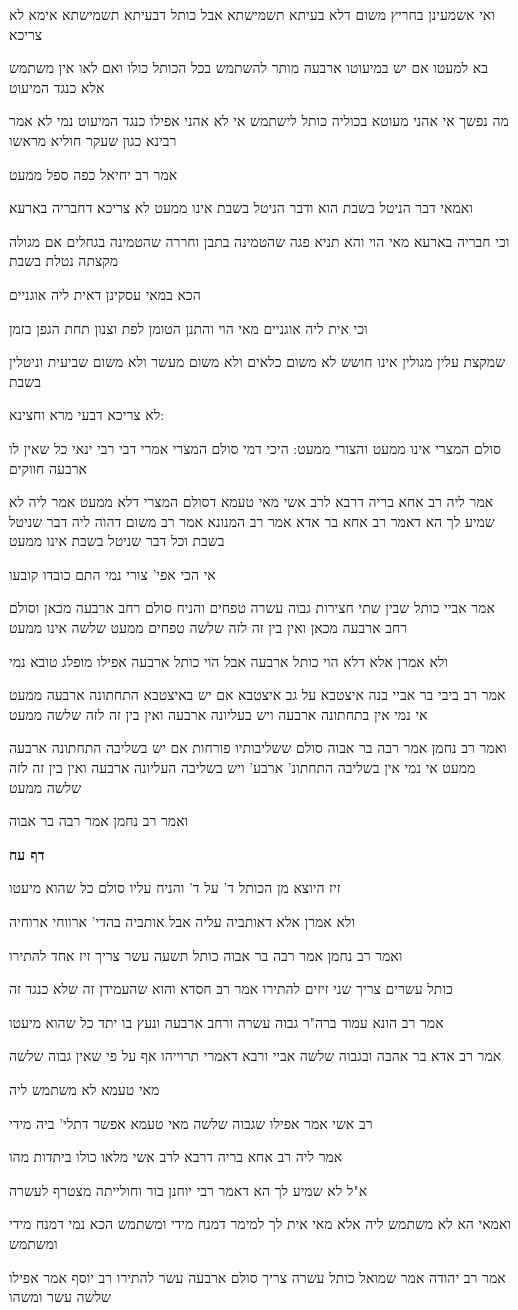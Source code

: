 \documentclass[12pt, openany]{book}
\newcommand{\sethebfont}{
\fontsize{10.5pt}{21.0pt} \selectfont
}
\newcommand{\textblock}[1]{
{\sethebfont #1\\}	
}
\newcommand{\sectname}{}
\newcommand{\newsection}[1]{
	\addcontentsline{toc}{section}{#1}
	\renewcommand{\sectname}{#1}	
	\vspace{-\baselineskip}
	\begin{center}
		\textbf{%
\fontsize{16pt}{16pt}\selectfont
			#1}
	\end{center}
	\vspace{-\baselineskip}
	\nopagebreak
}
\begin{document}
\textblock{ואי אשמעינן בחריץ משום דלא בעיתא תשמישתא אבל כותל דבעיתא תשמישתא אימא לא צריכא}
\textblock{בא למעטו אם יש במיעוטו ארבעה מותר להשתמש בכל הכותל כולו ואם לאו אין משתמש אלא כנגד המיעוט}
\textblock{מה נפשך אי אהני מעוטא בכוליה כותל לישתמש אי לא אהני אפילו כנגד המיעוט נמי לא אמר רבינא כגון שעקר חוליא מראשו}
\textblock{אמר רב יחיאל כפה ספל ממעט}
\textblock{ואמאי דבר הניטל בשבת הוא ודבר הניטל בשבת אינו ממעט לא צריכא דחבריה בארעא}
\textblock{וכי חבריה בארעא מאי הוי והא תניא פגה שהטמינה בתבן וחררה שהטמינה בגחלים אם מגולה מקצתה נטלת בשבת}
\textblock{הכא במאי עסקינן דאית ליה אוגניים}
\textblock{וכי אית ליה אוגניים מאי הוי והתנן הטומן לפת וצנון תחת הגפן בזמן}
\textblock{שמקצת עלין מגולין אינו חושש לא משום כלאים ולא משום מעשר ולא משום שביעית וניטלין בשבת}
\textblock{לא צריכא דבעי מרא וחצינא:}
\textblock{סולם המצרי אינו ממעט והצורי ממעט: היכי דמי סולם המצרי אמרי דבי רבי ינאי כל שאין לו ארבעה חווקים}
\textblock{אמר ליה רב אחא בריה דרבא לרב אשי מאי טעמא דסולם המצרי דלא ממעט אמר ליה לא שמיע לך הא דאמר רב אחא בר אדא אמר רב המנונא אמר רב משום דהוה ליה דבר שניטל בשבת וכל דבר שניטל בשבת אינו ממעט}
\textblock{אי הכי אפי' צורי נמי התם כובדו קובעו}
\textblock{אמר אביי כותל שבין שתי חצירות גבוה עשרה טפחים והניח סולם רחב ארבעה מכאן וסולם רחב ארבעה מכאן ואין בין זה לזה שלשה טפחים ממעט שלשה אינו ממעט}
\textblock{ולא אמרן אלא דלא הוי כותל ארבעה אבל הוי כותל ארבעה אפילו מופלג טובא נמי}
\textblock{אמר רב ביבי בר אביי בנה איצטבא על גב איצטבא אם יש באיצטבא התחתונה ארבעה ממעט אי נמי אין בתחתונה ארבעה ויש בעליונה ארבעה ואין בין זה לזה שלשה ממעט}
\textblock{ואמר רב נחמן אמר רבה בר אבוה סולם ששליבותיו פורחות אם יש בשליבה התחתונה ארבעה ממעט אי נמי אין בשליבה התחתונ' ארבע' ויש בשליבה העליונה ארבעה ואין בין זה לזה שלשה ממעט}
\textblock{ואמר רב נחמן אמר רבה בר אבוה}
\newsection{דף עח}
\textblock{זיז היוצא מן הכותל ד' על ד' והניח עליו סולם כל שהוא מיעטו}
\textblock{ולא אמרן אלא דאותביה עליה אבל אותביה בהדי' ארווחי ארוחיה}
\textblock{ואמר רב נחמן אמר רבה בר אבוה כותל תשעה עשר צריך זיז אחד להתירו}
\textblock{כותל עשרים צריך שני זיזים להתירו אמר רב חסדא והוא שהעמידן זה שלא כנגד זה}
\textblock{אמר רב הונא עמוד ברה"ר גבוה עשרה ורחב ארבעה ונעץ בו יתד כל שהוא מיעטו}
\textblock{אמר רב אדא בר אהבה ובגבוה שלשה אביי ורבא דאמרי תרוייהו אף על פי שאין גבוה שלשה}
\textblock{מאי טעמא לא משתמש ליה}
\textblock{רב אשי אמר אפילו שגבוה שלשה מאי טעמא אפשר דתלי' ביה מידי}
\textblock{אמר ליה רב אחא בריה דרבא לרב אשי מלאו כולו ביתדות מהו}
\textblock{א"ל לא שמיע לך הא דאמר רבי יוחנן בור וחולייתה מצטרף לעשרה}
\textblock{ואמאי הא לא משתמש ליה אלא מאי אית לך למימר דמנח מידי ומשתמש הכא נמי דמנח מידי ומשתמש}
\textblock{אמר רב יהודה אמר שמואל כותל עשרה צריך סולם ארבעה עשר להתירו רב יוסף אמר אפילו שלשה עשר ומשהו}
\end{document}
